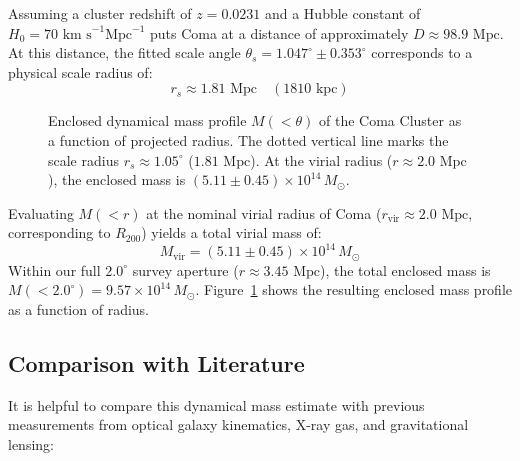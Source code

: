 \documentclass[twocolumn]{aastex631}
\begin{document}
Assuming a cluster redshift of $z = 0.0231$ and a Hubble constant of $H_0 = 70\text{ km s}^{-1}\text{Mpc}^{-1}$ puts Coma at a distance of approximately $D \approx 98.9\text{ Mpc}$. At this distance, the fitted scale angle $\theta_s = 1.047^\circ \pm 0.353^\circ$ corresponds to a physical scale radius of:
\begin{equation}
	r_s \approx 1.81\text{ Mpc} \quad (1810\text{ kpc})
\end{equation}

\begin{figure}[ht!]
	\centering
	\caption{Enclosed dynamical mass profile $M(<\theta)$ of the Coma Cluster as a function of projected radius. The dotted vertical line marks the scale radius $r_s \approx 1.05^\circ$ ($1.81\text{ Mpc}$). At the virial radius ($r \approx 2.0\text{ Mpc}$), the enclosed mass is $(5.11 \pm 0.45) \times 10^{14}\,M_\odot$.}
	\label{fig:mass_profile}
\end{figure}

Evaluating $M(<r)$ at the nominal virial radius of Coma ($r_{\text{vir}} \approx 2.0\text{ Mpc}$, corresponding to $R_{200}$) yields a total virial mass of:
\begin{equation}
	M_{\text{vir}} = (5.11 \pm 0.45) \times 10^{14}\,M_\odot
\end{equation}
Within our full $2.0^\circ$ survey aperture ($r \approx 3.45\text{ Mpc}$), the total enclosed mass is $M(<2.0^\circ) = 9.57 \times 10^{14}\,M_\odot$. Figure~\ref{fig:mass_profile} shows the resulting enclosed mass profile as a function of radius.

\subsection{Comparison with Literature}
It is helpful to compare this dynamical mass estimate with previous measurements from optical galaxy kinematics, X-ray gas, and gravitational lensing:
\end{document}
